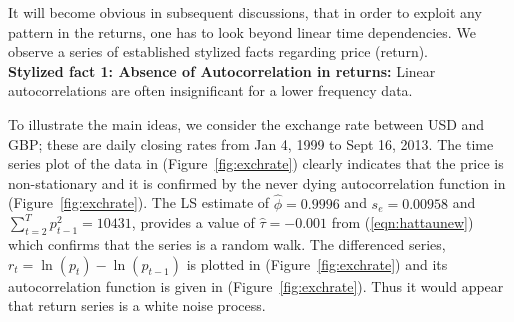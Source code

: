 It will become obvious in subsequent discussions, that in order to exploit any pattern in the returns, one has to look beyond linear time dependencies. We observe a series of established stylized facts regarding price (return). \\


\noindent\textbf{Stylized fact 1: Absence of Autocorrelation in returns:} Linear autocorrelations are often insignificant for a lower frequency data. 


To illustrate the main ideas, we consider the exchange rate between USD and GBP; these are daily closing rates from Jan 4, 1999 to Sept 16, 2013. The time series plot of the data in (Figure~\ref{fig:exchrate}) clearly indicates that the price is non-stationary and it is confirmed by the never dying autocorrelation function in (Figure~\ref{fig:exchrate}). The LS estimate of $\hat{\phi}= 0.9996$ and $s_e= 0.00958$ and $\sum_{t=2}^Tp_{t-1}^2= 10431$, provides a value of $\hat{\tau} = -0.001$ from (\ref{eqn:hattaunew}) which confirms that the series is a random walk. The differenced series, $r_t = \ln{(p_t)} - \ln{(p_{t-1})}$ is plotted in (Figure~\ref{fig:exchrate}) and its autocorrelation function is given in (Figure~\ref{fig:exchrate}). Thus it would appear that return series is a white noise process.



